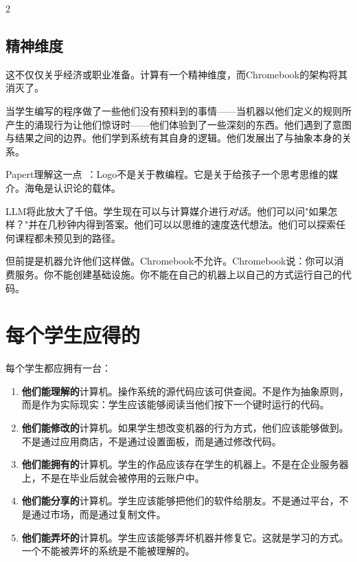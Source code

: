 \documentclass[11pt, a4paper]{article}
\begin{document}
\begin{multicols}{2}
\subsection{精神维度}

这不仅仅关乎经济或职业准备。计算有一个精神维度，而Chromebook的架构将其消灭了。

当学生编写的程序做了一些他们没有预料到的事情——当机器以他们定义的规则所产生的涌现行为让他们惊讶时——他们体验到了一些深刻的东西。他们遇到了意图与结果之间的边界。他们学到系统有其自身的逻辑。他们发展出了与抽象本身的关系。

Papert理解这一点~\citep{papert1980mindstorms}：Logo不是关于教编程。它是关于给孩子一个思考思维的媒介。海龟是认识论的载体。

LLM将此放大了千倍。学生现在可以与计算媒介进行\emph{对话}。他们可以问"如果怎样？"并在几秒钟内得到答案。他们可以以思维的速度迭代想法。他们可以探索任何课程都未预见到的路径。

但前提是机器允许他们这样做。Chromebook不允许。Chromebook说：你可以消费服务。你不能创建基础设施。你不能在自己的机器上以自己的方式运行自己的代码。


\section{每个学生应得的}

每个学生都应拥有一台：

\begin{enumerate}
  \item \textbf{他们能理解的}计算机。操作系统的源代码应该可供查阅。不是作为抽象原则，而是作为实际现实：学生应该能够阅读当他们按下一个键时运行的代码。

  \item \textbf{他们能修改的}计算机。如果学生想改变机器的行为方式，他们应该能够做到。不是通过应用商店，不是通过设置面板，而是通过修改代码。

  \item \textbf{他们能拥有的}计算机。学生的作品应该存在学生的机器上。不是在企业服务器上，不是在毕业后就会被停用的云账户中。

  \item \textbf{他们能分享的}计算机。学生应该能够把他们的软件给朋友。不是通过平台，不是通过市场，而是通过复制文件。

  \item \textbf{他们能弄坏的}计算机。学生应该能够弄坏机器并修复它。这就是学习的方式。一个不能被弄坏的系统是不能被理解的。


\end{enumerate}
\end{multicols}
\end{document}
